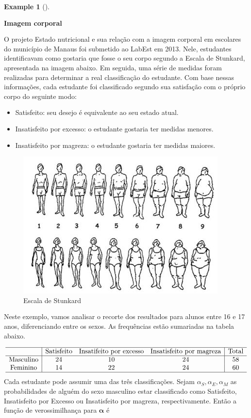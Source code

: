 \documentclass[
  letterpaper,
  DIV=11,
  numbers=noendperiod]{scrreprt}
\theoremstyle{definition}
\theoremstyle{plain}
\theoremstyle{definition}
\newtheorem{example}{Example}[chapter]
\theoremstyle{remark}
\begin{document}
\begin{example}[]\protect\hypertarget{exm-}{}\label{exm-}

\textbf{Imagem corporal}

O projeto Estado nutricional e sua relação com a imagem corporal em
escolares do município de Manaus foi submetido ao LabEst em 2013. Nele,
estudantes identificavam como gostaria que fosse o seu corpo segundo a
Escala de Stunkard, apresentada na imagem abaixo. Em seguida, uma série
de medidas foram realizadas para determinar a real classificação do
estudante. Com base nessas informações, cada estudante foi classificado
segundo sua satisfação com o próprio corpo do seguinte modo:

\begin{itemize}
\item
  Satisfeito: seu desejo é equivalente ao seu estado atual.
\item
  Insatisfeito por excesso: o estudante gostaria ter medidas menores.
\item
  Insatisfeito por magreza: o estudante gostaria ter medidas maiores.
\end{itemize}

\begin{figure}[H]

{\centering \includegraphics{percepcao-da-imagem-corporal-do-estudante-01.jpg}

}

\caption{Escala de Stunkard}

\end{figure}%

Neste exemplo, vamos analisar o recorte dos resultados para alunos entre
16 e 17 anos, diferenciando entre os sexos. As frequências estão
sumariadas na tabela abaixo.

\[\begin{array}{c|ccc|c}\hline
&\hbox{Satisfeito} & \hbox{Insatifeito por excesso} & \hbox{Insatisfeito por magreza} &\hbox{Total}\\ \hline
\hbox{Masculino} & 24 & 10 & 24 & 58 \\
\hbox{Feminino} & 14 & 22 & 24 & 60 \\ \hline
\end{array}
\] Cada estudante pode assumir uma das três classificações. Sejam
\(\alpha_S,\alpha_E,\alpha_M\) as probabilidades de alguém do sexo
masculino estar classificado como Satisfeito, Insatisfeito por Excesso
ou Insatisfeito por magreza, respectivamente. Então a função de
verossimilhança para \(\boldsymbol{\alpha}\) é


\end{example}
\end{document}
